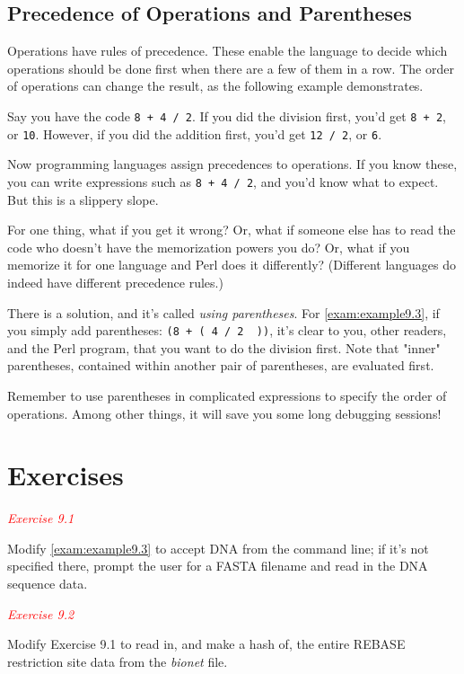 \subsection{Precedence of Operations and Parentheses}
\label{sect:section9.3.1}
Operations have rules of precedence. These enable the language to decide which operations should be done first when there are a few of them in a row. The order of operations can change the result, as the following example demonstrates.

Say you have the code \verb|8 + 4 / 2|. If you did the division first, you'd get \verb|8 + 2|, or \verb|10|. However, if you did the addition first, you'd get \verb|12 / 2|, or \verb|6|.

Now programming languages assign precedences to operations. If you know these, you can write expressions such as \verb|8 + 4 / 2|, and you'd know what to expect. But this is a slippery slope.

For one thing, what if you get it wrong? Or, what if someone else has to read the code who doesn't have the memorization powers you do? Or, what if you memorize it for one language and Perl does it differently? (Different languages do indeed have different precedence rules.)

There is a solution, and it's called \textit{using parentheses}. For \autoref{exam:example9.3}, if you simply add parentheses: \verb|(8 + ( 4 / 2  ))|, it's clear to you, other readers, and the Perl program, that you want to do the division first. Note that "inner" parentheses, contained within another pair of parentheses, are evaluated first.

Remember to use parentheses in complicated expressions to specify the order of operations. Among other things, it will save you some long debugging sessions! 

\section{Exercises}
\label{sect:section9.4}
\textcolor{red}{\textit{Exercise 9.1}}
\begin{adjustwidth}{2em}{}
Modify \autoref{exam:example9.3} to accept DNA from the command line; if it's not specified there, prompt the user for a FASTA filename and read in the DNA sequence data. 
\end{adjustwidth}

\textcolor{red}{\textit{Exercise 9.2}}
\begin{adjustwidth}{2em}{}
Modify Exercise 9.1 to read in, and make a hash of, the entire REBASE restriction site data from the \textit{bionet} file. 
\end{adjustwidth}

